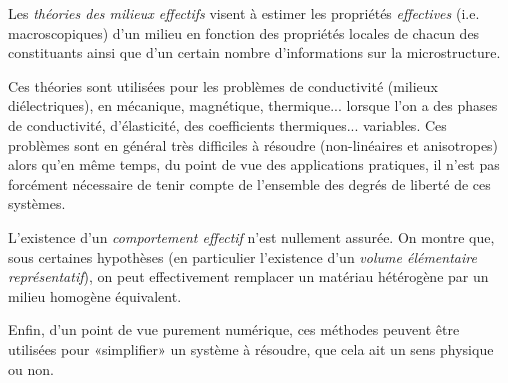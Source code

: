 \medskip
\begin{histoire}%
\ifVersionDuDocEstVincent{}\selectfont\fi
Les \emph{théories des milieux effectifs} visent à estimer les propriétés \emph{effectives} (i.e. macroscopiques) d'un milieu en fonction des propriétés locales de chacun des constituants ainsi que d'un certain nombre d'informations sur la microstructure.\ifVersionDuDocEstVincent\else\\[-2.5mm]\fi


\medskip
{}

\medskip
Ces théories sont utilisées pour les problèmes de conductivité (milieux diélectriques), en mécanique, magnétique, thermique... lorsque l'on a des phases de conductivité, d'élasticité, des coefficients thermiques... variables. Ces problèmes sont en général très difficiles à résoudre (non-linéaires et anisotropes) alors qu'en même temps, du point de vue des applications pratiques, il n'est pas forcément nécessaire de tenir compte de l'ensemble des degrés de liberté de ces systèmes.

\medskip
L'existence d'un \emph{comportement effectif} n'est nullement assurée. On montre que, sous certaines hypothèses (en particulier l'existence d'un \emph{volume élémentaire représentatif}), on peut effectivement remplacer un matériau hétérogène par un milieu homogène équivalent.

Enfin, d'un point de vue purement numérique, ces méthodes peuvent être utilisées pour «simplifier» un système à résoudre, que cela ait un sens physique ou non.
\end{histoire}

